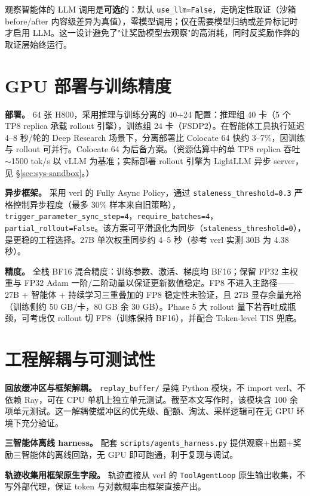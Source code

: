 观察智能体的 LLM 调用是\textbf{可选}的：默认 \texttt{use\_llm=False}，走确定性取证（沙箱 before/after 内容级差异为真值），零模型调用；仅在需要模型归纳或差异标记时才启用 LLM。这一设计避免了"让奖励模型去观察"的高消耗，同时反奖励作弊的取证层始终运行。

\section{GPU 部署与训练精度}
\label{sec:sys-gpu}

\textbf{部署。} 64 张 H800，采用推理与训练分离的 40+24 配置：推理组 40 卡（5 个 TP8 replica 承载 rollout 引擎），训练组 24 卡（FSDP2）。在智能体工具执行延迟 4--8 秒/轮的 Deep Research 场景下，分离部署比 Colocate 64 快约 3--7\%，因训练与 rollout 可并行。Colocate 64 为后备方案。（资源估算中的单 TP8 replica 吞吐 $\sim$1500 tok/s 以 vLLM 为基准；实际部署 rollout 引擎为 LightLLM 异步 server，见 \S\ref{sec:sys-sandbox}。）

\textbf{异步框架。} 采用 verl 的 Fully Async Policy，通过 \texttt{staleness\_threshold=0.3} 严格控制异步程度（最多 30\% 样本来自旧策略），\texttt{trigger\_parameter\_sync\_step=4}，\texttt{require\_batches=4}，\texttt{partial\_rollout=False}。该方案可平滑退化为同步（\texttt{staleness\_threshold=0}），是更稳的工程选择。27B 单次权重同步约 4--5 秒（参考 verl 实测 30B 为 4.38 秒）。

\textbf{精度。} 全栈 BF16 混合精度：训练参数、激活、梯度均 BF16；保留 FP32 主权重与 FP32 Adam 一阶/二阶动量以保证更新数值稳定。FP8 不进入主路径——27B + 智能体 + 持续学习三重叠加的 FP8 稳定性未验证，且 27B 显存余量充裕（训练侧约 50 GB/卡，80 GB 余 30 GB）。Phase 5 大 rollout 量下若吞吐成瓶颈，可考虑仅 rollout 切 FP8（训练保持 BF16），并配合 Token-level TIS 兜底。

\section{工程解耦与可测试性}
\label{sec:sys-decouple}

\textbf{回放缓冲区与框架解耦。} \texttt{replay\_buffer/} 是纯 Python 模块，不 import verl、不依赖 Ray，可在 CPU 单机上独立单元测试。截至本文写作时，该模块含 100 余项单元测试。这一解耦使缓冲区的优先级、配额、淘汰、采样逻辑可在无 GPU 环境下充分验证。

\textbf{三智能体离线 harness。} 配套 \texttt{scripts/agents\_harness.py} 提供观察+出题+奖励三智能体的离线回路，无 GPU 即可跑通，利于复现与调试。

\textbf{轨迹收集用框架原生字段。} 轨迹直接从 verl 的 \texttt{ToolAgentLoop} 原生输出收集，不写外部代理，保证 token 与对数概率由框架直接产出。

